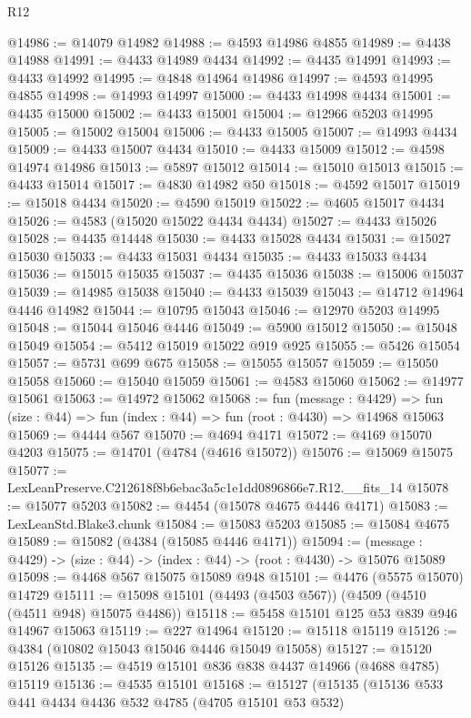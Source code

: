 \begin{lexlean}{R12}
\begin{coremodule}
@14986 := @14079 @14982
@14988 := @4593 @14986 @4855
@14989 := @4438 @14988
@14991 := @4433 @14989 @4434
@14992 := @4435 @14991
@14993 := @4433 @14992
@14995 := @4848 @14964 @14986
@14997 := @4593 @14995 @4855
@14998 := @14993 @14997
@15000 := @4433 @14998 @4434
@15001 := @4435 @15000
@15002 := @4433 @15001
@15004 := @12966 @5203 @14995
@15005 := @15002 @15004
@15006 := @4433 @15005
@15007 := @14993 @4434
@15009 := @4433 @15007 @4434
@15010 := @4433 @15009
@15012 := @4598 @14974 @14986
@15013 := @5897 @15012
@15014 := @15010 @15013
@15015 := @4433 @15014
@15017 := @4830 @14982 @50
@15018 := @4592 @15017
@15019 := @15018 @4434
@15020 := @4590 @15019
@15022 := @4605 @15017 @4434
@15026 := @4583 (@15020 @15022 @4434 @4434)
@15027 := @4433 @15026
@15028 := @4435 @14448
@15030 := @4433 @15028 @4434
@15031 := @15027 @15030
@15033 := @4433 @15031 @4434
@15035 := @4433 @15033 @4434
@15036 := @15015 @15035
@15037 := @4435 @15036
@15038 := @15006 @15037
@15039 := @14985 @15038
@15040 := @4433 @15039
@15043 := @14712 @14964 @4446 @14982
@15044 := @10795 @15043
@15046 := @12970 @5203 @14995
@15048 := @15044 @15046 @4446
@15049 := @5900 @15012
@15050 := @15048 @15049
@15054 := @5412 @15019 @15022 @919 @925
@15055 := @5426 @15054
@15057 := @5731 @699 @675
@15058 := @15055 @15057
@15059 := @15050 @15058
@15060 := @15040 @15059
@15061 := @4583 @15060
@15062 := @14977 @15061
@15063 := @14972 @15062
@15068 := fun (message : @4429) =>
  fun (size : @44) => fun (index : @44) => fun (root : @4430) => @14968 @15063
@15069 := @4444 @567
@15070 := @4694 @4171
@15072 := @4169 @15070 @4203
@15075 := @14701 (@4784 (@4616 @15072))
@15076 := @15069 @15075
@15077 := LexLeanPreserve.C212618f8b6ebac3a5c1e1dd0896866e7.R12.__fits_14
@15078 := @15077 @5203
@15082 := @4454 (@15078 @4675 @4446 @4171)
@15083 := LexLeanStd.Blake3.chunk
@15084 := @15083 @5203
@15085 := @15084 @4675
@15089 := @15082 (@4384 (@15085 @4446 @4171))
@15094 := (message : @4429) -> (size : @44) -> (index : @44) -> (root : @4430) -> @15076 @15089
@15098 := @4468 @567 @15075 @15089 @948
@15101 := @4476 (@5575 @15070) @14729
@15111 := @15098 @15101 (@4493 (@4503 @567)) (@4509 (@4510 (@4511 @948) @15075 @4486))
@15118 := @5458 @15101 @125 @53 @839 @946 @14967 @15063
@15119 := @227 @14964
@15120 := @15118 @15119
@15126 := @4384 (@10802 @15043 @15046 @4446 @15049 @15058)
@15127 := @15120 @15126
@15135 := @4519 @15101 @836 @838 @4437 @14966 (@4688 @4785) @15119
@15136 := @4535 @15101
@15168 := @15127
    (@15135
      (@15136
        @533
        @441
        @4434
        @4436
        @532
        @4785
        (@4705 @15101 @53 @532)

\end{coremodule}
\end{lexlean}
